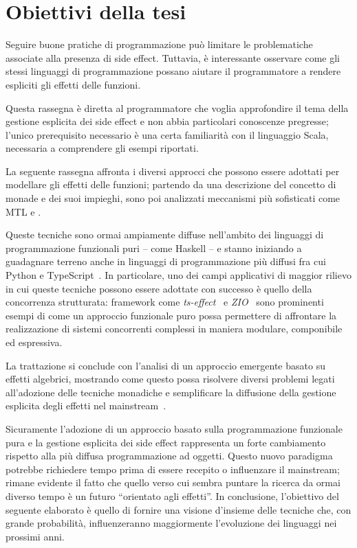 \section{Obiettivi della tesi}

Seguire buone pratiche di programmazione può limitare le problematiche associate alla presenza di side effect. Tuttavia, è interessante osservare come gli stessi linguaggi di programmazione possano aiutare il programmatore a rendere espliciti gli effetti delle funzioni.

Questa rassegna è diretta al programmatore che voglia approfondire il tema della gestione esplicita dei side effect e non abbia particolari conoscenze pregresse; l'unico prerequisito necessario è una certa familiarità con il linguaggio Scala, necessaria a comprendere gli esempi riportati.

La seguente rassegna affronta i diversi approcci che possono essere adottati per modellare gli effetti delle funzioni; partendo da una descrizione del concetto di monade e dei suoi impieghi, sono poi analizzati meccanismi più sofisticati come \ac{MTL} e .

Queste tecniche sono ormai ampiamente diffuse nell'ambito dei linguaggi di programmazione funzionali puri -- come Haskell -- e stanno iniziando a guadagnare terreno anche in linguaggi di programmazione più diffusi fra cui Python e TypeScript~\cite{cit:pyro,cit:ts-effect,cit:wasmfx}.
In particolare, uno dei campi applicativi di maggior rilievo in cui queste tecniche possono essere adottate con successo è quello della concorrenza strutturata: framework come \emph{ts-effect}~\cite{cit:ts-effect} e \emph{ZIO}~\cite{cit:zio} sono prominenti esempi di come un approccio funzionale puro possa permettere di affrontare la realizzazione di sistemi concorrenti complessi in maniera modulare, componibile ed espressiva.

La trattazione si conclude con l'analisi di un approccio emergente basato su effetti algebrici, mostrando come questo possa risolvere diversi problemi legati all'adozione delle tecniche monadiche e semplificare la diffusione della gestione esplicita degli effetti nel mainstream~\cite{cit:algebraic-effect-handlers-go-mainstream}.

Sicuramente l'adozione di un approccio basato sulla programmazione funzionale pura e la gestione esplicita dei side effect rappresenta un forte cambiamento rispetto alla più diffusa programmazione ad oggetti. Questo nuovo paradigma potrebbe richiedere tempo prima di essere recepito o influenzare il mainstream; rimane evidente il fatto che quello verso cui sembra puntare la ricerca da ormai diverso tempo è un futuro ``orientato agli effetti''. In conclusione, l'obiettivo del seguente elaborato è quello di fornire una visione d'insieme delle tecniche che, con grande probabilità, influenzeranno maggiormente l'evoluzione dei linguaggi nei prossimi anni.
